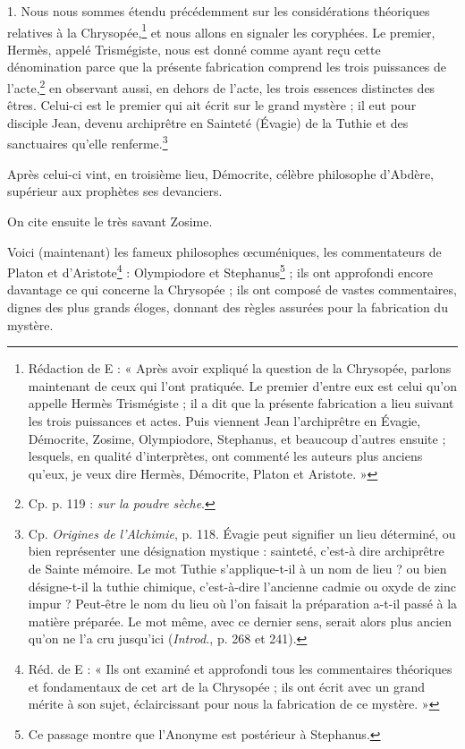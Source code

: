 \documentclass[a4paper, 11pt, oneside, polutonikogreek, french]{article}
\begin{document}
1. Nous nous sommes étendu précédemment sur les considérations théoriques relatives à la Chrysopée,\footnote{Rédaction de E : « Après avoir expliqué la question de la Chrysopée, parlons maintenant de ceux qui l'ont pratiquée. Le premier d'entre eux est celui qu'on appelle Hermès Trismégiste ; il a dit que la présente fabrication a lieu suivant les trois puissances et actes. Puis viennent Jean l'archiprêtre en Évagie, Démocrite, Zosime, Olympiodore, Stephanus, et beaucoup d'autres ensuite ; lesquels, en qualité d'interprètes, ont commenté les auteurs plus anciens qu'eux, je veux dire Hermès, Démocrite, Platon et Aristote. »} et nous allons en signaler les coryphées. Le premier, Hermès, appelé Trismégiste, nous est donné comme ayant reçu cette dénomination parce que la présente fabrication comprend les trois puissances de l'acte,\footnote{Cp. p. 119 : \emph{sur la poudre sèche}.} en observant aussi, en dehors de l'acte, les trois essences distinctes des êtres. Celui-ci est le premier qui ait écrit sur le grand mystère ; il eut pour disciple Jean, devenu archiprêtre en Sainteté (Évagie) de la Tuthie et des sanctuaires qu'elle renferme.\footnote{Cp. \emph{Origines de l'Alchimie}, p. 118. Évagie peut signifier un lieu déterminé, ou bien représenter une désignation mystique : sainteté, c'est-à dire archiprêtre de Sainte mémoire. Le mot Tuthie s'applique-t-il à un nom de lieu ? ou bien désigne-t-il la tuthie chimique, c'est-à-dire l'ancienne cadmie ou oxyde de zinc impur ? Peut-être le nom du lieu où l'on faisait la préparation a-t-il passé à la matière préparée. Le mot même, avec ce dernier sens, serait alors plus ancien qu'on ne l'a cru jusqu'ici (\emph{Introd.}, p. 268 et 241).}

Après celui-ci vint, en troisième lieu, Démocrite, célèbre philosophe d'Abdère, supérieur aux prophètes ses devanciers.

On cite ensuite le très savant Zosime.

Voici (maintenant) les fameux philosophes œcuméniques, les commentateurs de Platon et d'Aristote\footnote{Réd. de E : « Ils ont examiné et approfondi tous les commentaires théoriques et fondamentaux de cet art de la Chrysopée ; ils ont écrit avec un grand mérite à son sujet, éclaircissant pour nous la fabrication de ce mystère. »} : Olympiodore et Stephanus\footnote{Ce passage montre que l'Anonyme est postérieur à Stephanus.} ; ils ont approfondi encore davantage ce qui concerne la Chrysopée ; ils ont composé de vastes commentaires, dignes des plus grands éloges, donnant des règles assurées pour la fabrication du mystère.
\end{document}
